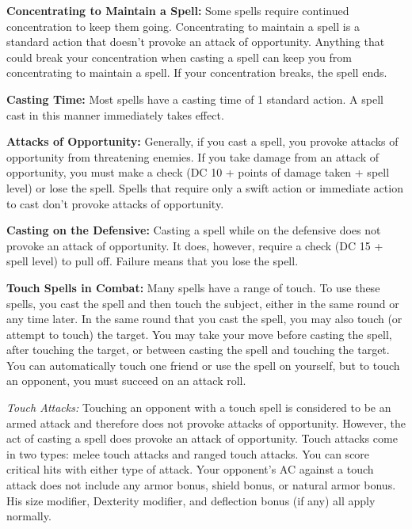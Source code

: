 \textbf{Concentrating to Maintain a Spell:} Some spells require continued concentration to keep them going. Concentrating to maintain a spell is a standard action that doesn't provoke an attack of opportunity. Anything that could break your concentration when casting a spell can keep you from concentrating to maintain a spell. If your concentration breaks, the spell ends.

\textbf{Casting Time:} Most spells have a casting time of 1 standard action. A spell cast in this manner immediately takes effect.

\textbf{Attacks of Opportunity:} Generally, if you cast a spell, you provoke attacks of opportunity from threatening enemies. If you take damage from an attack of opportunity, you must make a  check (DC 10 + points of damage taken + spell level) or lose the spell. Spells that require only a swift action or immediate action to cast don't provoke attacks of opportunity.

\textbf{Casting on the Defensive:} Casting a spell while on the defensive does not provoke an attack of opportunity. It does, however, require a  check (DC 15 + spell level) to pull off. Failure means that you lose the spell.

\textbf{Touch Spells in Combat:} Many spells have a range of touch. To use these spells, you cast the spell and then touch the subject, either in the same round or any time later. In the same round that you cast the spell, you may also touch (or attempt to touch) the target. You may take your move before casting the spell, after touching the target, or between casting the spell and touching the target. You can automatically touch one friend or use the spell on yourself, but to touch an opponent, you must succeed on an attack roll.

\textit{Touch Attacks:} Touching an opponent with a touch spell is considered to be an armed attack and therefore does not provoke attacks of opportunity. However, the act of casting a spell does provoke an attack of opportunity. Touch attacks come in two types: melee touch attacks and ranged touch attacks. You can score critical hits with either type of attack. Your opponent's AC against a touch attack does not include any armor bonus, shield bonus, or natural armor bonus. His size modifier, Dexterity modifier, and deflection bonus (if any) all apply normally.

